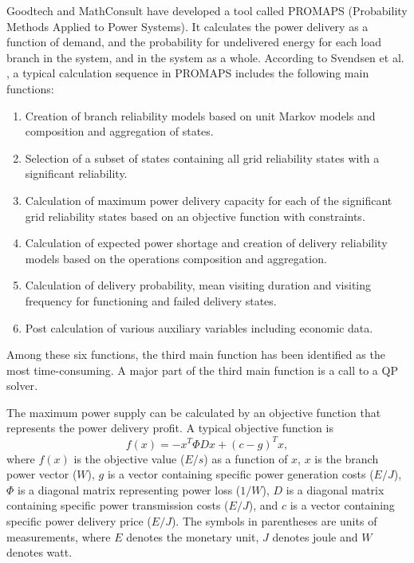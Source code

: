 \documentclass[a4paper,12pt]{report}
\begin{document}
Goodtech and MathConsult have developed a tool called PROMAPS
(Probability Methods Applied to Power Systems). It calculates the power
delivery as a function of demand, and the probability for undelivered
energy for each load branch in the system, and in the system as a whole.
According to Svendsen et al. \cite{trond}, a typical calculation sequence
in PROMAPS includes the following main functions:
\begin{enumerate}
\item Creation of branch reliability models based on unit Markov models and
      composition and aggregation of states.
\item Selection of a subset of states containing all grid reliability states
      with a significant reliability.
\item Calculation of maximum power delivery capacity for each of the
      significant grid reliability states based on an objective function with
      constraints.
\item Calculation of expected power shortage and creation of delivery
      reliability models based on the operations composition and aggregation.
\item Calculation of delivery probability, mean visiting duration and visiting
      frequency for functioning and failed delivery states.
\item Post calculation of various auxiliary variables including economic data.
\end{enumerate}
Among these six functions, the third main function has been identified as the
most time-consuming. A major part of the third main function is a call to a
QP solver\cite{trond}.

The maximum power
supply can be calculated by an objective function that represents the power
delivery profit. A typical objective function is
\begin{equation}
f(x) = - x^T \Phi D x + (c-g)^T x, \label{eq:goodtech}
\end{equation}
where $f(x)$ is the objective value ($E/s$) as a function of $x$, $x$ is the
branch power vector ($W$), $g$ is a vector containing specific power
generation costs ($E/J$), $\Phi$ is a diagonal matrix representing power loss
($1/W$), $D$ is a diagonal matrix containing specific power transmission costs
($E/J$), and $c$ is a vector containing specific power delivery price
($E/J$). The symbols in parentheses are units of measurements, where $E$
denotes the monetary unit, $J$ denotes joule and $W$ denotes
watt\cite{digernes}.
\end{document}
